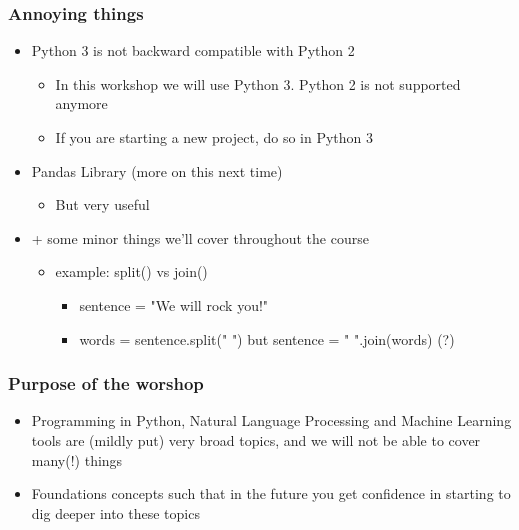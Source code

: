 \documentclass[compress, aspectratio=54]{beamer}
\begin{document}
\begin{frame}
\frametitle{Annoying things}
\begin{itemize}

\item Python 3 is not backward compatible with Python 2
\begin{itemize}
\item In this workshop we will use Python 3. Python 2 is not supported anymore
\item If you are starting a new project, do so in Python 3
\end{itemize}

\item Pandas Library (more on this next time)
\begin{itemize}
\item But very useful 
\end{itemize}
\item + some minor things we'll cover throughout the course 
\begin{itemize}

\item example: split() vs join()
\begin{itemize}
\item sentence = "We will rock you!"

\item words = sentence.split(" ") but sentence = " ".join(words) (?)
\end{itemize}


\end{itemize}

\end{itemize}

\end{frame}
\begin{frame}
\frametitle{Purpose of the worshop}
\begin{itemize}

\item Programming in Python, Natural Language Processing and Machine Learning tools are (mildly put) very broad topics, and we will not be able to cover many(!) things
\item Foundations concepts such that in the future you get confidence in starting to dig deeper into these topics
 
\end{itemize}

\end{frame}
\end{document}
